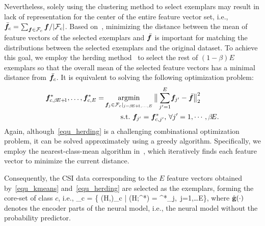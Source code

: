 Nevertheless, solely using the clustering method to select exemplars may result in lack of representation for the center of the entire feature vector set, i.e., $\bar{\bm f_c} = \sum_{\bm f\in\mathcal F_c} \bm f / |\mathcal{F}_c|$.
Based on~\cite{Gretton12JMLR_Kernel}, minimizing the distance between the mean of feature vectors of the selected exemplars and $\bar{\bm f}$ is important for matching the distributions between the selected exemplars and the original dataset.
To achieve this goal, we employ the herding method~\cite{Rebuffi17CVPR_iCaRL} to select the rest of $(1-\beta)E$ exemplars so that the overall mean of the selected feature vectors has a minimal distance from $\bar{\bm f}_c$.
It is equivalent to solving the following optimization problem:
\begin{align}
\label{equ_herding}
\bm f_{c, \beta\! E+\!1}^*,\dots,\bm f_{c,E}^*  = 
&\operatorname*{argmin}_{\bm f_{j}\in\mathcal{F}_c|_{j=\beta\! E+\!1,\dots,E}} \big\| \sum_{j'=1}^{E}\! \bm f_{j'}- \bar{\bm f}\big\|_2^2 \\
&\qquad~ \text{s.t.~$\bm f_{j'} = \bm f_{c,j'}^*$, $\forall j'=1,\cdots, \beta\!E$.} \nonumber
\end{align}
Again, although~\eqref{equ_herding} is a challenging combinational optimization problem, it can be solved approximately using a greedy algorithm.
Specifically, we employ the nearest-class-mean algorithm in~\cite{Rebuffi17CVPR_iCaRL}, which iteratively finds each feature vector to minimize the current distance.

Consequently, the CSI data corresponding to the $E$ feature vectors obtained by~\eqref{equ_kmeans} and~\eqref{equ_herding} are selected as the exemplars, forming the core-set of class $c$, i.e.,
\beq
\label{equ_ori_coreset}
\cS_c = \{ (\bm H,)\in\cD_c | \hat{\bgun}(\bm H;\btheta^*) = \bfv^*_j,~\exists j=1,\dots E\},
\eeq
where $\hat{\mathbf{g}}(\cdot)$ denotes the encoder parts of the neural model, i.e., the neural model without the probability predictor.

